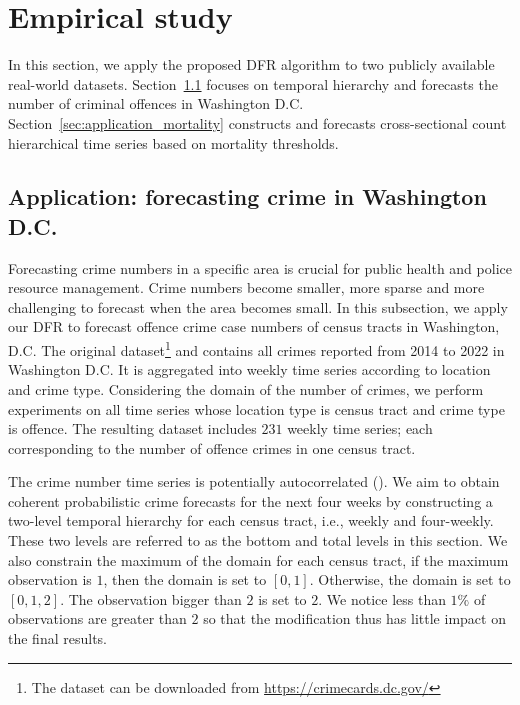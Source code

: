 \documentclass[a4paper,review,12pt,authoryear]{elsarticle}
\begin{document}
     \section{Empirical study}
     \label{sec:application}
     In this section, we apply the proposed DFR algorithm to two publicly available real-world datasets.
     Section~\ref{sec:application_crime} focuses on temporal hierarchy and forecasts the number of criminal offences in Washington D.C. Section~\ref{sec:application_mortality} constructs and forecasts cross-sectional count hierarchical time series based on mortality thresholds. 
     
     \subsection{Application: forecasting crime in Washington D.C.}
     \label{sec:application_crime}
     
     Forecasting crime numbers in a specific area is crucial for public health and police resource management.
     Crime numbers become smaller, more sparse and more challenging to forecast when the area becomes small.
     In this subsection, we apply our DFR to forecast offence crime case numbers of census tracts in Washington, D.C. 
     The original dataset\footnote{The dataset can be downloaded from \url{https://crimecards.dc.gov/}} and contains all crimes reported from 2014 to 2022 in Washington D.C. It is aggregated into weekly time series according to location and crime type. 
     Considering the domain of the number of crimes, we perform experiments on all time series whose location type is census tract and crime type is offence.
     The resulting dataset includes $231$ weekly time series; each corresponding to the number of offence crimes in one census tract.
     
     The crime number time series is potentially autocorrelated (\citealp{aldor-noimanSpatioTemporalLowCount2013}). 
     We aim to obtain coherent probabilistic crime forecasts for the next four weeks by constructing a two-level temporal hierarchy for each census tract, i.e., weekly and four-weekly. 
     These two levels are referred to as the bottom and total levels in this section. 
     We also constrain the maximum of the domain for each census tract, if the maximum observation is $1$, then the domain is set to $[0, 1]$. Otherwise, the domain is set to $[0, 1, 2]$. The observation bigger than $2$ is set to $2$. 
     We notice less than $1\%$ of observations are greater than $2$ so that the modification thus has little impact on the final results.
     
\end{document}
